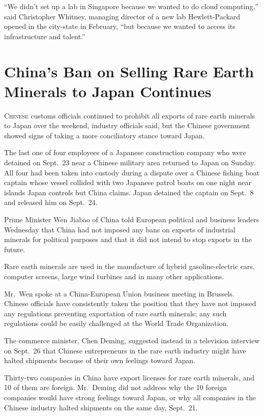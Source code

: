 ﻿\documentclass[12pt]{article}
\begin{document}
``We didn't set up a lab in Singapore because we wanted to do cloud computing,'' said Christopher
Whitney, managing director of a new lab Hewlett-Packard opened in the city-state in February, ``but
because we wanted to access its infrastructure and talent.''

\section{China's Ban on Selling Rare Earth Minerals to Japan Continues}

\lettrine{C}{hinese} customs officials continued to prohibit all exports of
rare earth minerals to Japan over the weekend, industry officials said, but the Chinese government
showed signs of taking a more conciliatory stance toward Japan.

The last one of four employees of a Japanese construction company who were detained on Sept.~23 near
a Chinese military area returned to Japan on Sunday. All four had been taken into custody during a
dispute over a Chinese fishing boat captain whose vessel collided with two Japanese patrol boats on
one night near islands Japan controls but China claims. Japan detained the captain on Sept.~8 and
released him on Sept.~24.

Prime Minister Wen Jiabao of China told European political and business leaders Wednesday that China
had not imposed any bans on exports of industrial minerals for political purposes and that it did
not intend to stop exports in the future.

Rare earth minerals are used in the manufacture of hybrid gasoline-electric cars, computer screens,
large wind turbines and in many other applications.

Mr.~Wen spoke at a China-European Union business meeting in Brussels. Chinese officials have
consistently taken the position that they have not imposed any regulations preventing exportation of
rare earth minerals; any such regulations could be easily challenged at the World Trade
Organization.

The commerce minister, Chen Deming, suggested instead in a television interview on Sept.~26 that
Chinese entrepreneurs in the rare earth industry might have halted shipments because of their own
feelings toward Japan.

Thirty-two companies in China have export licenses for rare earth minerals, and 10 of them are
foreign. Mr.~Deming did not address why the 10 foreign companies would have strong feelings toward
Japan, or why all companies in the Chinese industry halted shipments on the same day, Sept.~21.
\end{document}
